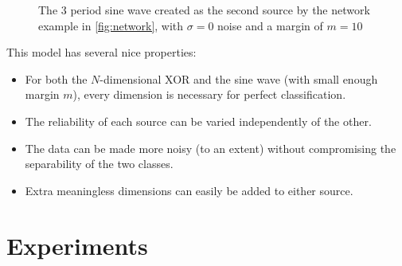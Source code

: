 \documentclass{article}
\begin{document}
\begin{figure}
\begin{minipage}{.5\textwidth}
    \caption{The 3 period sine wave created as the second source by the network
        example in \ref{fig:network}, with $\sigma=0$ noise and a margin of
        $m=10$}
    \label{fig:sine_wave}
\end{minipage}
\end{figure}

This model has several nice properties:
\begin{itemize}
    \item For both the $N$-dimensional XOR and the sine wave (with small enough
        margin $m$), every dimension is necessary for perfect classification.
    \item The reliability of each source can be varied independently of the
        other.
    \item The data can be made more noisy (to an extent) without
        compromising the separability of the two classes.
    \item Extra meaningless dimensions can easily be added to either source.
\end{itemize}






\section{Experiments}
\end{document}
